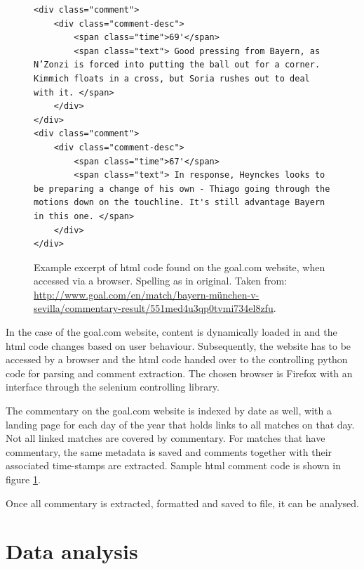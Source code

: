 \documentclass[10pt, a4paper]{UUThesisTemplate}
\begin{document}
\begin{figure}
\hspace{0.7cm}
\begin{minipage}{6.8cm}
\begin{lstlisting}[language=HTML5]
<div class="comment">
    <div class="comment-desc">
        <span class="time">69'</span>
        <span class="text"> Good pressing from Bayern, as N’Zonzi is forced into putting the ball out for a corner. Kimmich floats in a cross, but Soria rushes out to deal with it. </span>
    </div>
</div>
<div class="comment">
    <div class="comment-desc">
        <span class="time">67'</span>
        <span class="text"> In response, Heynckes looks to be preparing a change of his own - Thiago going through the motions down on the touchline. It's still advantage Bayern in this one. </span>
    </div>
</div>
\end{lstlisting}
\end{minipage}
\caption{Example excerpt of html code found on the goal.com website, when accessed via a browser. Spelling as in original. Taken from: \url{http://www.goal.com/en/match/bayern-münchen-v-sevilla/commentary-result/551med4u3qp0tvmi734el8zfu}.}
\label{lst:htmlgoal}
\vspace{-2cm}
\end{figure}

In the case of the goal.com website, content is dynamically loaded in and the html code changes based on user behaviour. Subsequently, the website has to be accessed by a browser and the html code handed over to the controlling python code for parsing and comment extraction. The chosen browser is Firefox with an interface through the selenium\cite{selenium} controlling library.

The commentary on the goal.com website is indexed by date as well, with a landing page for each day of the year that holds links to all matches on that day. Not all linked matches are covered by commentary. For matches that have commentary, the same metadata is saved and comments together with their associated time-stamps are extracted. Sample html comment code is shown in figure \ref{lst:htmlgoal}.

Once all commentary is extracted, formatted and saved to file, it can be analysed.



\section{Data analysis}
\end{document}
